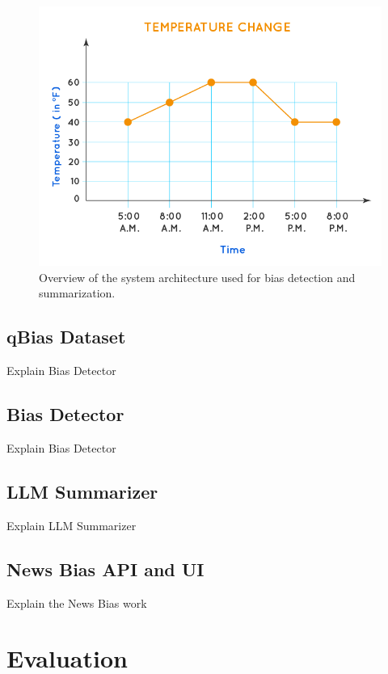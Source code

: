\documentclass{article}
\begin{document}
\begin{figure}[t]
  \centering
  \includegraphics[width=0.9\linewidth]{figures/example.png}
  \caption{Overview of the system architecture used for bias detection and summarization.}
  \label{fig:system-arch}
\end{figure}


\subsection{qBias Dataset} 

Explain Bias Detector


\subsection{Bias Detector} 

Explain Bias Detector


\subsection{LLM Summarizer} 

Explain LLM Summarizer


\subsection{News Bias API and UI}  

Explain the News Bias work


\section{Evaluation}
\end{document}
